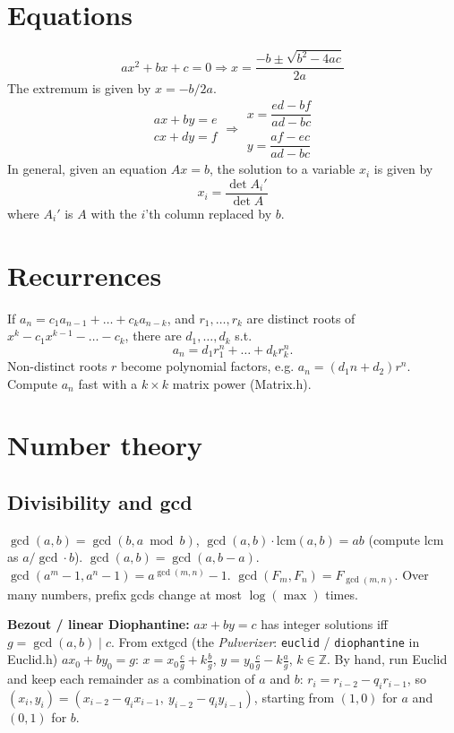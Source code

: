 \section{Equations}
\[ax^2+bx+c=0 \Rightarrow x = \frac{-b\pm\sqrt{b^2-4ac}}{2a}\]
The extremum is given by $x = -b/2a$.
\[\begin{aligned}ax+by=e\\cx+dy=f\end{aligned}
\Rightarrow
\begin{aligned}x=\dfrac{ed-bf}{ad-bc}\\y=\dfrac{af-ec}{ad-bc}\end{aligned}\]
In general, given an equation $Ax = b$, the solution to a variable $x_i$ is given by
\[x_i = \frac{\det A_i'}{\det A} \]
where $A_i'$ is $A$ with the $i$'th column replaced by $b$.

\section{Recurrences}
If $a_n = c_1 a_{n-1} + \dots + c_k a_{n-k}$, and $r_1, \dots, r_k$ are distinct roots of
$x^k - c_1 x^{k-1} - \dots - c_k$, there are $d_1, \dots, d_k$ s.t.
\[a_n = d_1r_1^n + \dots + d_kr_k^n. \]
Non-distinct roots $r$ become polynomial factors, e.g. $a_n = (d_1n + d_2)r^n$.
Compute $a_n$ fast with a $k\times k$ matrix power (Matrix.h).

\section{Number theory}
\subsection{Divisibility and gcd}
$\gcd(a,b)=\gcd(b, a \bmod b)$, $\gcd(a,b)\cdot\text{lcm}(a,b)=ab$
(compute $\text{lcm}$ as $a/\gcd\cdot b$). $\gcd(a,b)=\gcd(a, b-a)$.
$\gcd(a^m-1, a^n-1) = a^{\gcd(m,n)}-1$. $\gcd(F_m,F_n)=F_{\gcd(m,n)}$.
Over many numbers, prefix gcds change at most $\log(\max)$ times.

\textbf{Bezout / linear Diophantine:} $ax+by=c$ has integer solutions iff $g=\gcd(a,b)\mid c$.
From extgcd (the \emph{Pulverizer}: \texttt{euclid} / \texttt{diophantine} in Euclid.h)
$ax_0+by_0=g$: $x = x_0\frac cg + k\frac bg$, $y = y_0\frac cg - k\frac ag$, $k\in\mathbb Z$.
By hand, run Euclid and keep each remainder as a combination of $a$ and $b$:
$r_i = r_{i-2} - q_i r_{i-1}$, so $(x_i, y_i) = (x_{i-2} - q_ix_{i-1},\ y_{i-2} - q_iy_{i-1})$,
starting from $(1,0)$ for $a$ and $(0,1)$ for $b$.


